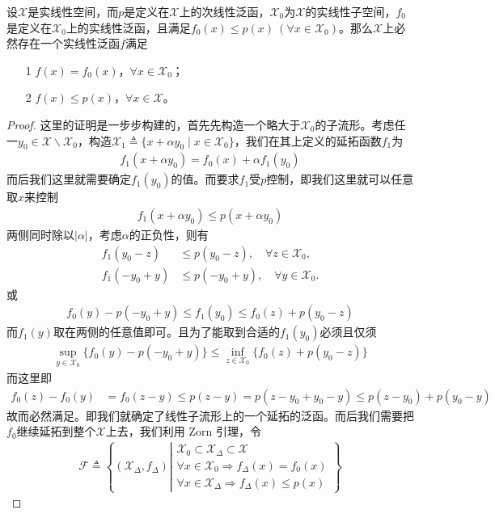 	\begin{theorem}
		设$\mathscr{X}$是实线性空间，而$p$是定义在$\mathscr{X}$上的次线性泛函，$\mathscr{X}_0$为$\mathscr{X}$的实线性子空间，$f_0$是定义在$\mathscr{X}_0$上的实线性泛函，且满足$f_0(x)\leqslant p(x)\ (\forall x\in \mathscr{X}_0)$。那么$\mathscr{X}$上必然存在一个实线性泛函$f$满足
		\begin{itemize}
			\item[1] $f(x) = f_0(x)$，$\forall x\in\mathscr{X}_0$；
			\item[2] $f(x) \leqslant p(x)$，$\forall x\in \mathscr{X}$。
		\end{itemize}
	\end{theorem}
	\begin{proof}
		这里的证明是一步步构建的，首先先构造一个略大于$\mathscr{X}_0$的子流形。考虑任一$y_0\in\mathscr{X}\backslash\mathscr{X}_0$，构造$\mathscr{X}_1\triangleq\{x + \alpha y_0\mid x\in\mathscr{X}_0\}$，我们在其上定义的延拓函数$f_1$为
		\begin{align*}
			f_1(x + \alpha y_0) = f_0(x) + \alpha f_1(y_0)
		\end{align*}
		而后我们这里就需要确定$f_1(y_0)$的值。而要求$f_1$受$p$控制，即我们这里就可以任意取$x$来控制
		\begin{align*}
			f_1(x + \alpha y_0) \leqslant p(x + \alpha y_0)
		\end{align*}
		两侧同时除以$|\alpha|$，考虑$\alpha$的正负性，则有
		\begin{align*}
			f_1(y_0 - z) &\leqslant p(y_0 - z), \quad \forall z\in\mathscr{X}_0, \\
			f_1(-y_0 + y) &\leqslant p(-y_0 + y),\quad \forall y\in\mathscr{X}_0.
		\end{align*}
		或
		\begin{align*}
			f_0(y) - p(-y_0 + y) \leqslant f_1(y_0) \leqslant f_0(z) + p(y_0 - z)
		\end{align*}
		而$f_1(y)$取在两侧的任意值即可。且为了能取到合适的$f_1(y_0)$必须且仅须
		\begin{align*}
			\sup\limits_{y\in\mathscr{X}_0} \{f_0(y) - p(-y_0 + y)\} \leqslant \inf\limits_{z\in\mathscr{X}_0} \{f_0(z) + p(y_0 - z)\}
		\end{align*}
		而这里即
		\begin{align*}
			f_0(z) - f_0(y) &= f_0(z-y) \leqslant p(z-y) = p(z - y_0 + y_0 - y) \leqslant p(z- y_0) + p(y_0 - y)
		\end{align*}
		故而必然满足。即我们就确定了线性子流形上的一个延拓的泛函。而后我们需要把$f_0$继续延拓到整个$\mathscr{X}$上去，我们利用 Zorn 引理，令
		\begin{align*}
			\mathscr{F} \triangleq \left\lbrace (\mathscr{X}_{\Delta}, f_{\Delta}) \left|
			\begin{array}{l}
				\mathscr{X}_0\subset \mathscr{X}_{\Delta} \subset \mathscr{X} \\
				\forall x\in\mathscr{X}_0\Rightarrow f_{\Delta}(x) = f_0(x) \\
				\forall x\in\mathscr{X}_{\Delta} \Rightarrow f_{\Delta}(x) \leqslant p(x)
			\end{array}
			\right.   \right\rbrace
		\end{align*}
		

\end{proof}
